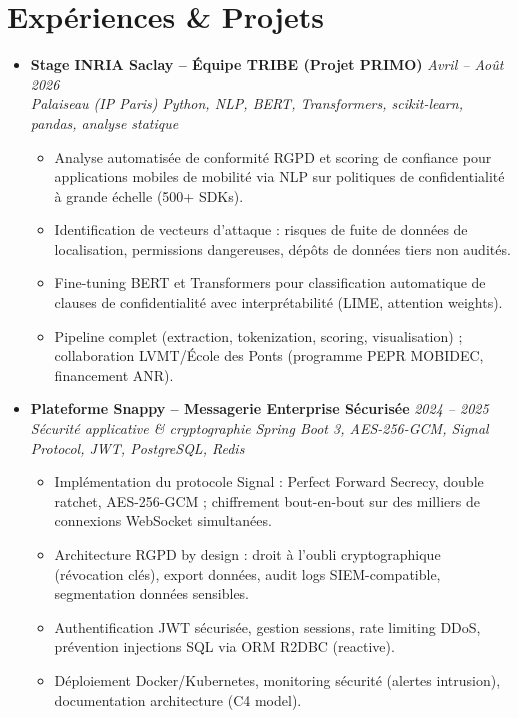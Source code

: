 \documentclass[a4paper,11pt]{article}
\begin{document}
\section{Exp\'eriences \& Projets}
\begin{itemize}[leftmargin=*, label={-}]
    \item \textbf{Stage INRIA Saclay -- \'Equipe TRIBE (Projet PRIMO)} \hfill \textit{Avril -- Ao\^ut 2026} \\
    \textit{Palaiseau (IP Paris)} \hfill \textit{Python, NLP, BERT, Transformers, scikit-learn, pandas, analyse statique}
    \vspace{-2pt}
    \begin{itemize}[leftmargin=0.4cm, nosep, label=\tiny$\bullet$]
        \item \small{Analyse automatisée de conformité RGPD et scoring de confiance pour applications mobiles de mobilité via NLP sur politiques de confidentialité à grande échelle (500+ SDKs).}
        \item \small{Identification de vecteurs d'attaque : risques de fuite de donn\'ees de localisation, permissions dangereuses, d\'epôts de donn\'ees tiers non audit\'es.}
        \item \small{Fine-tuning BERT et Transformers pour classification automatique de clauses de confidentialité avec interprétabilité (LIME, attention weights).}
        \item \small{Pipeline complet (extraction, tokenization, scoring, visualisation) ; collaboration LVMT/\'Ecole des Ponts (programme PEPR MOBIDEC, financement ANR).}
    \end{itemize}
    \vspace{3pt}

    \item \textbf{Plateforme Snappy -- Messagerie Enterprise Sécuris\'ee} \hfill \textit{2024 -- 2025} \\
    \textit{Sécurité applicative \& cryptographie} \hfill \textit{Spring Boot 3, AES-256-GCM, Signal Protocol, JWT, PostgreSQL, Redis}
    \vspace{-2pt}
    \begin{itemize}[leftmargin=0.4cm, nosep, label=\tiny$\bullet$]
        \item \small{Impl\'ementation du protocole Signal : Perfect Forward Secrecy, double ratchet, AES-256-GCM ; chiffrement bout-en-bout sur des milliers de connexions WebSocket simultanées.}
        \item \small{Architecture RGPD by design : droit à l'oubli cryptographique (révocation clés), export données, audit logs SIEM-compatible, segmentation données sensibles.}
        \item \small{Authentification JWT sécurisée, gestion sessions, rate limiting DDoS, prévention injections SQL via ORM R2DBC (reactive).}
        \item \small{Déploiement Docker/Kubernetes, monitoring sécurité (alertes intrusion), documentation architecture (C4 model).}
    \end{itemize}
    \vspace{3pt}


\end{itemize}
\end{document}
